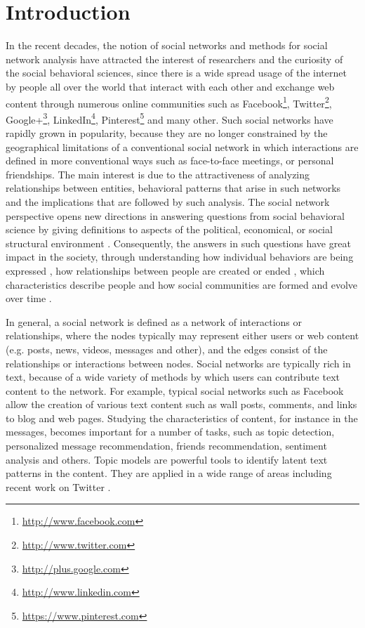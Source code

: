 \section{Introduction}


In the recent decades, the notion of social networks and methods for social network analysis have attracted the interest of researchers and the curiosity of the social behavioral sciences, since there is a wide spread usage of the internet by people all over the world that interact with each other and exchange web content through numerous online communities such as Facebook\footnote{\url{http://www.facebook.com}}, Twitter\footnote{\url{http://www.twitter.com}}, Google+\footnote{\url{http://plus.google.com}}, LinkedIn\footnote{\url{http://www.linkedin.com}}, Pinterest\footnote{\url{https://www.pinterest.com}} and many other. Such social networks have rapidly grown
in popularity, because they are no longer constrained by the geographical limitations of a conventional social network in which interactions are defined in more conventional ways such as face-to-face meetings, or personal friendships. The main interest is due to the attractiveness of analyzing relationships between entities, behavioral patterns that arise in such networks and the implications that are followed by such analysis. The social network perspective opens new directions in answering questions from social behavioral science by giving definitions to aspects of the political, economical, or social structural environment \cite{sna}. Consequently, the answers in such questions have great impact in the society, through understanding how individual behaviors are being expressed \cite{ba}, how relationships between people are created or ended \cite{friend_pred}, which characteristics describe people \cite{am2} and how social communities are formed \cite{com_det} and evolve over time \cite{com_ev1}. 


In general, a social network is defined as a network of interactions or relationships, where the nodes typically may represent either users or web content (e.g. posts, news, videos, messages and other), and the edges consist of the relationships or interactions between nodes. Social networks are typically rich in text, because of a wide variety of methods by which users can contribute text content to the network. For example,
typical social networks such as Facebook allow the creation of various text content such as wall posts, comments, and links to blog and web pages. Studying the characteristics of content, for instance in the messages, becomes important for a number of tasks, such as topic detection, personalized message recommendation, friends recommendation, sentiment analysis and others. Topic models \cite{blei2} are powerful tools to identify latent text patterns in the content. They are applied in a wide range of areas including recent work on Twitter \cite{microblogs}.

